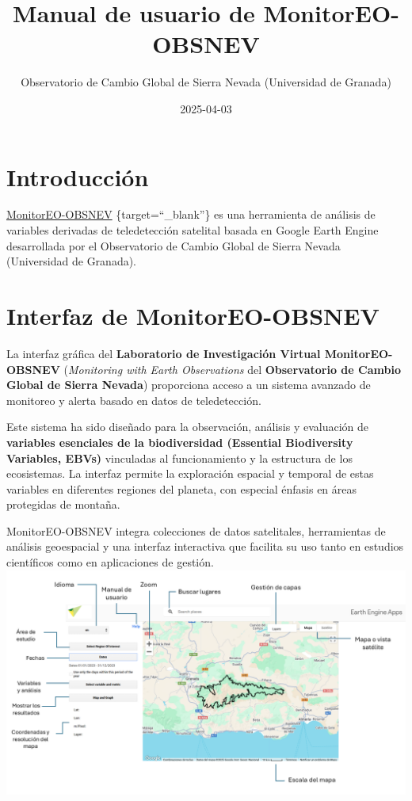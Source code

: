 \documentclass[
]{book}
\title{Manual de usuario de MonitorEO-OBSNEV}
\author{Observatorio de Cambio Global de Sierra Nevada (Universidad de Granada)}
\date{2025-04-03}
\begin{document}
\maketitle

{
\setcounter{tocdepth}{1}
\tableofcontents
}
\chapter{Introducción}\label{intro}

\href{https://sl.ugr.es/monitoreoobsnev}{MonitorEO-OBSNEV} \{target=``\_blank''\} es una herramienta de análisis de variables derivadas de teledetección satelital basada en Google Earth Engine desarrollada por el Observatorio de Cambio Global de Sierra Nevada (Universidad de Granada).

\chapter{Interfaz de MonitorEO-OBSNEV}\label{interfaz}

La interfaz gráfica del \textbf{Laboratorio de Investigación Virtual MonitorEO-OBSNEV} (\emph{Monitoring with Earth Observations} del \textbf{Observatorio de Cambio Global de Sierra Nevada}) proporciona acceso a un sistema avanzado de monitoreo y alerta basado en datos de teledetección.

Este sistema ha sido diseñado para la observación, análisis y evaluación de \textbf{variables esenciales de la biodiversidad (Essential Biodiversity Variables, EBVs)} vinculadas al funcionamiento y la estructura de los ecosistemas. La interfaz permite la exploración espacial y temporal de estas variables en diferentes regiones del planeta, con especial énfasis en áreas protegidas de montaña.

MonitorEO-OBSNEV integra colecciones de datos satelitales, herramientas de análisis geoespacial y una interfaz interactiva que facilita su uso tanto en estudios científicos como en aplicaciones de gestión.
\includegraphics{assets/InterfazMonitorEO_es.png}
\end{document}
